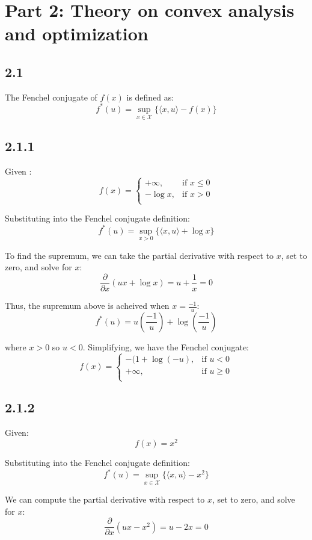 \documentclass[12pt]{article}
\begin{document}
\newpage
\section*{Part 2: Theory on convex analysis and optimization}
\subsection*{2.1}

The Fenchel conjugate of $f(x)$ is defined as:
\[f^*(u) = \sup_{x\in \mathcal{X}} \{ \langle x, u\rangle - f(x) \}\]

\subsection*{2.1.1}

Given :
\[ f(x) = \begin{cases}
      +\infty, & \text{if } x \leq 0 \\
      -\log x, & \text{if } x > 0 \\
   \end{cases}\]

Substituting into the Fenchel conjugate definition:
\[f^*(u) = \sup_{x > 0} \{ \langle x, u\rangle +  \log x \}\]

To find the supremum, we can take the partial derivative with respect to $x$, set to zero, and solve for $x$:
\[\frac{\partial}{\partial x}(ux + \log x) = u + \frac{1}{x} = 0\]

Thus, the supremum above is acheived when $x=\frac{-1}{u}$:
\[f^*(u) = u \left(\frac{-1}{u} \right) +  \log\left(\frac{-1}{u} \right) \]

where $x>0$ so $u < 0$.
Simplifying, we have the Fenchel conjugate:
\[ f(x) = \begin{cases}
      - (1 + \log (-u), & \text{if } u < 0 \\
      +\infty, & \text{if } u \geq 0 \\
   \end{cases}\]


\subsection*{2.1.2} Given:
\[f(x) = x^2\]

Substituting into the Fenchel conjugate definition:
\[f^*(u) = \sup_{x\in \mathcal{X}} \{ \langle x, u\rangle - x^2 \}\]

We can compute the partial derivative with respect to $x$, set to zero, and solve for $x$:
\[\frac{\partial}{\partial x}(ux - x^2) = u - 2x = 0\]
\end{document}
